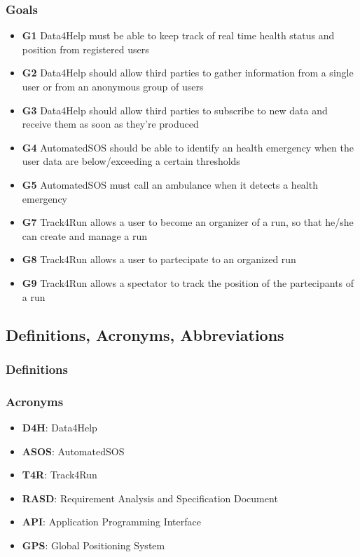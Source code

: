 \subsubsection{Goals}
\begin{itemize}
\item \textbf{G1} Data4Help must be able to keep track of real time health status and position from registered users
\item \textbf{G2} Data4Help should allow third parties to gather information from a single user or from an anonymous group of users
\item \textbf{G3} Data4Help should allow third parties to subscribe to new data and receive them as soon as they're produced
\item \textbf{G4} AutomatedSOS should be able to identify an health emergency when the user data are below/exceeding a certain thresholds
\item \textbf{G5} AutomatedSOS must call an ambulance when it detects a health emergency
\item \textbf{G7} Track4Run allows a user to become an organizer of a run, so that he/she can create and manage a run
\item \textbf{G8} Track4Run allows a user to partecipate to an organized run
\item \textbf{G9} Track4Run allows a spectator to track the position of the partecipants of a run 
\end{itemize}
\subsection{Definitions, Acronyms, Abbreviations}
\subsubsection{Definitions}
\subsubsection{Acronyms}
\begin{itemize}
\item \textbf{D4H}: Data4Help
\item \textbf{ASOS}: AutomatedSOS
\item \textbf{T4R}: Track4Run
\item \textbf{RASD}: Requirement Analysis and Specification Document
\item \textbf{API}: Application Programming Interface
\item \textbf{GPS}: Global Positioning System

\end{itemize}

